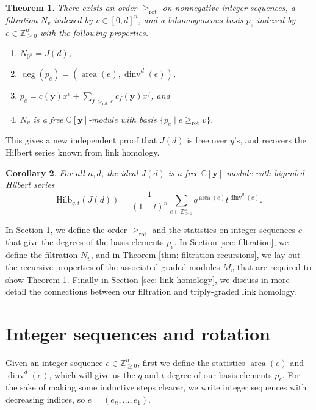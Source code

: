 \documentclass[submission]{FPSAC2027}
\newcommand{\Z}{\mathbb{Z}}
\newcommand{\C}{\mathbb{C}}
\DeclareMathOperator{\area}{area}
\DeclareMathOperator{\dinv}{dinv}
\newcommand{\rot}{\geq_{\mathrm{rot}}}
\newcommand{\uv}{\underline{v}}
\newcommand{\Y}{\C[\mathbf{y}]}
\newcommand{\Hilb}{\mathrm{Hilb}}
\newtheorem{thm}{Theorem}
\newtheorem{cor}[thm]{Corollary}
\begin{document}
\begin{thm}
    \label{thm: intro basis}
    There exists an order $\rot$ on nonnegative integer sequences, a filtration $N_v$ indexed by $v \in [0,d]^n$, and a bihomogeneous basis $p_e$ indexed by $e \in \Z_{\geq 0}^n$ with the following properties.
    \begin{enumerate}
        \item $N_{0^n} = J(d)$,
        \item $\deg(p_e) = (\area(e), \dinv^d(e))$,
        \item $\displaystyle p_e = c(\mathbf{y}) x^e + \sum_{f\, >_{\mathrm{rot}} \,e} c_f(\mathbf{y})x^f$,
        and 
        \item $N_v$ is a free $\Y$-module with basis $\{p_e \mid e \rot v\}$.
    \end{enumerate}
\end{thm}

This gives a new independent proof that $J(d)$ is free over $y$'s, and recovers the Hilbert series known from link homology.

\begin{cor}
    \label{cor: J free}
    For all $n,d$, the ideal $J(d)$ is a free $\Y$-module with bigraded Hilbert series
    $$\Hilb_{q,t}\left(J(d)\right) = \frac{1}{(1-t)^n} \sum_{e \in \Z_{\geq 0}^n} q^{\area(e)}t^{\dinv^d(e)}.$$
\end{cor}

In Section \ref{sec: rotation}, we define the order $\rot$ and the statistics on integer sequences $e$ that give the degrees of the basis elements $p_e$. In Section \ref{sec: filtration}, we define the filtration $N_v$, and in Theorem \ref{thm: filtration recursions}, we lay out the recursive properties of the associated graded modules $M_{\uv}$ that are required to show Theorem \ref{thm: intro basis}. Finally in Section \ref{sec: link homology}, we discuss in more detail the connections between our filtration and triply-graded link homology.

\section{Integer sequences and rotation}
\label{sec: rotation}

Given an integer sequence $e \in \Z_{\geq 0}^n$, first we define the statistics $\area(e)$ and $\dinv^d(e)$, which will give us the $q$ and $t$ degree of our basis elements $p_e$. For the sake of making some inductive steps clearer, we write integer sequences with decreasing indices, so $e = (e_n, \dots, e_1)$.
\end{document}
